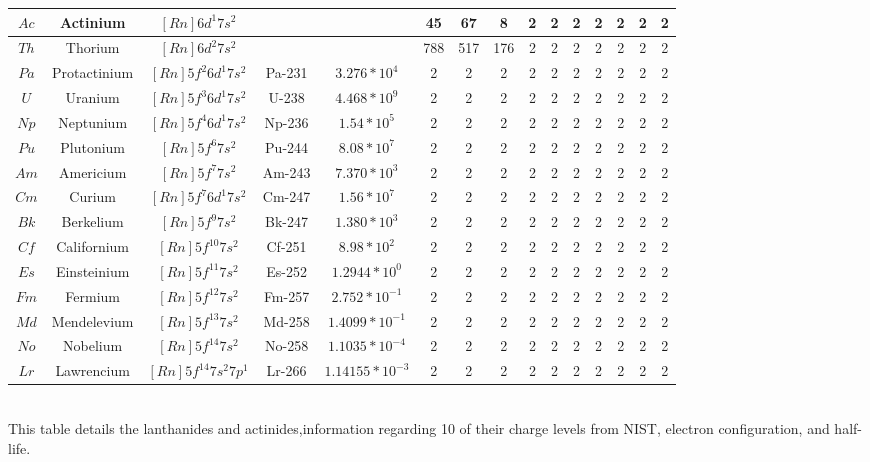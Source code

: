 \documentclass[2pt]{article}
\begin{document}
\begin{tabular}{|c|c|c|c|c|c|c|c|c|c|c|c|c|c|c|}
$Ac$ & Actinium & $[Rn] 6d^1 7s^2$ & & & 45 & 67 & 8 & 2 & 2 & 2 & 2 & 2 & 2 & 2\\ \hline
$Th$ & Thorium & $ [Rn] 6d^2 7s^2$ & & & 788 & 517 & 176 & 2 & 2 & 2 & 2 & 2 & 2 & 2\\ \hline
$Pa$ & Protactinium & $[Rn] 5f^2 6d^1 7s^2$ & Pa-231 & $3.276*10^4$ & 2 & 2 & 2 & 2 & 2 & 2 & 2 & 2 & 2 & 2\\ \hline
$U$  & Uranium & $[Rn] 5f^3 6d^1 7s^2$ & U-238 & $4.468*10^9 $ & 2 & 2 & 2 & 2 & 2 & 2 & 2 & 2 & 2 & 2\\ \hline
$Np$ & Neptunium & $[Rn] 5f^4 6d^1 7s^2$ & Np-236 & $1.54*10^5$ & 2 & 2 & 2 & 2 & 2 & 2 & 2 & 2 & 2 & 2\\ \hline
$Pu$ & Plutonium & $[Rn] 5f^6 7s^2$ & Pu-244 & $8.08*10^7$ & 2 & 2 & 2 & 2 & 2 & 2 & 2 & 2 & 2 & 2\\ \hline
$Am$ & Americium & $[Rn] 5f^7 7s^2$ & Am-243 & $7.370*10^3$ & 2 & 2 & 2& 2 & 2 & 2 & 2 & 2 & 2 & 2\\ \hline
$Cm$ & Curium & $[Rn] 5f^7 6d^1 7s^2$ & Cm-247 & $1.56*10^7$ & 2 & 2 & 2 & 2 & 2 & 2 & 2 & 2 & 2 & 2\\ \hline
$Bk$ & Berkelium & $[Rn] 5f^9 7s^2$ & Bk-247 & $1.380*10^3$ & 2 & 2 & 2 & 2 & 2 & 2 & 2 & 2 & 2 & 2\\ \hline
$Cf$ & Californium & $[Rn] 5f^10 7s^2$ & Cf-251 & $8.98*10^2$ & 2 & 2 & 2 & 2 & 2 & 2 & 2 & 2 & 2 & 2\\ \hline
$Es$ & Einsteinium & $[Rn] 5f^11 7s^2$ & Es-252 & $1.2944*10^0$ & 2 & 2 & 2 & 2 & 2 & 2 & 2 & 2 & 2 & 2\\ \hline
$Fm$ & Fermium & $[Rn] 5f^12 7s^2$ & Fm-257 & $2.752*10^{-1}$ & 2 & 2 & 2 & 2 & 2 & 2 & 2 & 2 & 2 & 2\\ \hline
$Md$ & Mendelevium & $[Rn] 5f^13 7s^2$ & Md-258 & $1.4099*10^{-1}$ & 2 & 2 & 2 & 2 & 2 & 2 & 2 & 2 & 2 & 2\\ \hline
$No$ & Nobelium & $[Rn] 5f^14 7s^2$ & No-258 & $1.1035*10^{-4}$ & 2 & 2 & 2 & 2 & 2 & 2 & 2 & 2 & 2 & 2\\ \hline
$Lr$ & Lawrencium & $ [Rn] 5f^14 7s^2 7p^1$ & Lr-266 & $1.14155*10^{-3}$ & 2 & 2 & 2 & 2 & 2 & 2 & 2 & 2 & 2 & 2\\ \hline
\end{tabular}\\
\bigskip
This table details the lanthanides and actinides,information regarding 10 of their charge levels from NIST, electron configuration, and half-life.\\
\cite{NIST_ASD}


\end{document}
